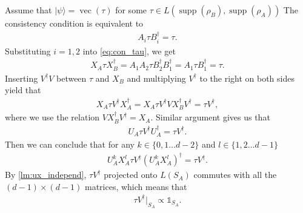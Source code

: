 \documentclass[11pt,letterpaper]{article}
\newcommand{\ket}[1]{|#1\rangle}
\newcommand{\x}{\otimes}
\DeclareMathOperator{\vc}{vec}
\DeclareMathOperator{\supp}{supp}
\newcommand{\1}{\mathbb{1}}
\theoremstyle{definition}
\begin{document}
Assume that $\ket{\psi} = \vc(\tau)$ for some $\tau \in L(\supp(\rho_B), \supp(\rho_A))$
The consistency condition is equivalent to
\begin{align}
\label{eq:con_tau}
	A_i \tau B_i^\dagger = \tau.
\end{align}
Substituting $i=1,2$ into \cref{eq:con_tau}, we get 
\begin{align}
	X_A \tau X_B^\dagger = A_1A_2\tau B_2^\dagger B_1^\dagger = A_1\tau B_1^\dagger = \tau.
\end{align}
Inserting $V^\dagger V$ between $\tau$ and $X_B$ and multiplying $V^\dagger$ to the right on both sides yield that 
\begin{align}
	X_A \tau V^\dagger X_A^\dagger = X_A \tau V^\dagger VX_B^\dagger V^\dagger = \tau V^\dagger,
\end{align}
where we use the relation $VX_B^\dagger V^\dagger = X_A$.
Similar argument gives us that 
\begin{align}
	U_A \tau V^\dagger  U_A^\dagger = \tau V^\dagger.
\end{align}
Then we can conclude that for any $k \in \{0,1 \dots d-2\}$ and $l \in \{1,2\dots d-1\}$
\begin{align}
	U_A^kX_A^l \tau V^\dagger (U_A^kX_A^l)^\dagger = \tau V^\dagger.
\end{align}
By \cref{lm:ux_independ}, $\tau V^\dagger$ projected onto $L(S_A)$ commutes with all the $(d-1) \times (d-1)$ matrices, which means that 
\begin{align}
	\label{eq:d-1}
	\tau V^\dagger|_{S_A}  \propto \1_{S_A}.
\end{align}
\end{document}
